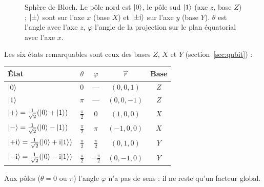\begin{figure}[!ht]
\caption{Sphère de Bloch. Le pôle nord est $|0\rangle$, le pôle sud $|1\rangle$ (axe $z$, base $Z$) ;
$|\pm\rangle$ sont sur l'axe $x$ (base $X$) et $|{\pm}\mathrm{i}\rangle$ sur l'axe $y$ (base $Y$).
$\theta$ est l'angle avec l'axe $z$, $\varphi$ l'angle de la projection sur le plan
équatorial avec l'axe $x$.}
\label{fig:bloch}
\end{figure}

Les six états remarquables sont ceux des bases $Z$, $X$ et $Y$ (section~\ref{sec:qubit}) :

\begin{center}
\renewcommand{\arraystretch}{1.5}
\begin{tabular}{@{}lcccc@{}}
\toprule
\textbf{État} & $\theta$ & $\varphi$ & $\vec r$ & \textbf{Base} \\
\midrule
$|0\rangle$ & $0$ & --- & $(0,0,1)$ & $Z$ \\
$|1\rangle$ & $\pi$ & --- & $(0,0,-1)$ & $Z$ \\
$|+\rangle=\frac{1}{\sqrt2}(|0\rangle+|1\rangle)$ & $\frac\pi2$ & $0$ & $(1,0,0)$ & $X$ \\
$|-\rangle=\frac{1}{\sqrt2}(|0\rangle-|1\rangle)$ & $\frac\pi2$ & $\pi$ & $(-1,0,0)$ & $X$ \\
$|{+}\mathrm{i}\rangle=\frac{1}{\sqrt2}(|0\rangle+\mathrm{i}|1\rangle)$ & $\frac\pi2$ & $\frac\pi2$ & $(0,1,0)$ & $Y$ \\
$|{-}\mathrm{i}\rangle=\frac{1}{\sqrt2}(|0\rangle-\mathrm{i}|1\rangle)$ & $\frac\pi2$ & $-\frac\pi2$ & $(0,-1,0)$ & $Y$ \\
\bottomrule
\end{tabular}
\end{center}

Aux pôles ($\theta=0$ ou $\pi$) l'angle $\varphi$ n'a pas de sens : il ne reste qu'un
facteur global.

